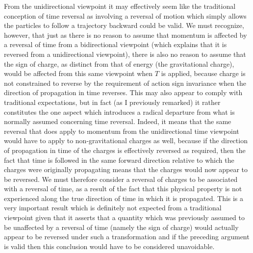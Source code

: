 \documentclass[notitlepage,12pt]{report}
\begin{document}
From the unidirectional viewpoint it may effectively seem like the traditional conception of time reversal as involving a reversal of motion which simply allows the particles to follow a trajectory backward could be valid. We must recognize, however, that just as there is no reason to assume that momentum is affected by a reversal of time from a bidirectional viewpoint (which explains that it is reversed from a unidirectional viewpoint), there is also no reason to assume that the sign of charge, as distinct from that of energy (the gravitational charge), would be affected from this same viewpoint when $T$ is applied, because charge is not constrained to reverse by the requirement of action sign invariance when the direction of propagation in time reverses. This may also appear to comply with traditional expectations, but in fact (as I previously remarked) it rather constitutes the one aspect which introduces a radical departure from what is normally assumed concerning time reversal. Indeed, it means that the same reversal that does apply to momentum from the unidirectional time viewpoint would have to apply to non-gravitational charges as well, because if the direction of propagation in time of the charges is effectively reversed as required, then the fact that time is followed in the same forward direction relative to which the charges were originally propagating means that the charges would now appear to be reversed. We must therefore consider a reversal of charges to be associated with a reversal of time, as a result of the fact that this physical property is not experienced along the true direction of time in which it is propagated. This is a very important result which is definitely not expected from a traditional viewpoint given that it asserts that a quantity which was previously assumed to be unaffected by a reversal of time (namely the sign of charge) would actually appear to be reversed under such a transformation and if the preceding argument is valid then this conclusion would have to be considered unavoidable.
\end{document}
